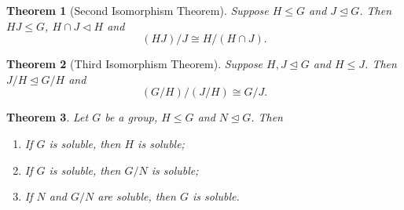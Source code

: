 \documentclass[12pt]{article}
\newtheorem{theorem}{Theorem}
\begin{document}
\begin{theorem}[Second Isomorphism Theorem] \label{thm:second-iso}
    Suppose $H \le G$ and $J \trianglelefteq G$. Then $HJ \le G$, $H \cap J \triangleleft H$ and $$
    (HJ) / J \cong H / (H \cap J). 
    $$
\end{theorem}
\begin{theorem}[Third Isomorphism Theorem] \label{thm:third-iso}
    Suppose $H, J \trianglelefteq G$ and $H \le J$. Then $J/H \trianglelefteq G/H$ and $$
    (G/H)/(J/H) \cong G / J.    $$
\end{theorem}

\begin{theorem} \label{thm:soluble-main}
    Let $G$ be a group, $H \le G$ and $N \trianglelefteq G$. Then 
    \begin{enumerate}
        \item If $G$ is soluble, then $H$ is soluble;
        \item If $G$ is soluble, then $G / N$ is soluble; 
        \item If $N$ and $G / N$ are soluble, then $G$ is soluble. 
    \end{enumerate}
\end{theorem}
\end{document}
